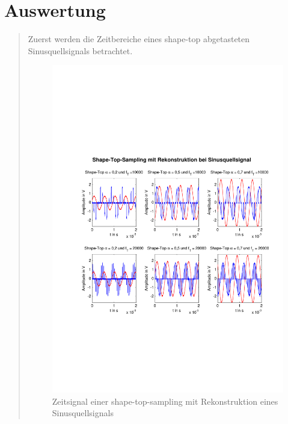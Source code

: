
    
    \section{Auswertung}
    \begin{quote}    
    
    	Zuerst werden die Zeitbereiche eines shape-top abgetasteten
    	Sinusquellsignals betrachtet.
        
    	\begin{figure}[H]
    \centering
        \includegraphics[scale=0.7, trim = 0cm 0cm 0cm 0cm,
        clip]{./Bilder/shape-top-sinus}
            \caption{Zeitsignal einer shape-top-sampling mit Rekonstruktion
            eines Sinusquellsignals}
  	    \end{figure}
  	    

\end{quote}
